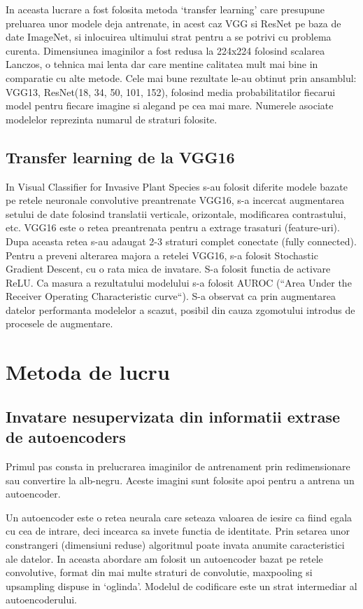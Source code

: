 \documentclass{article}
\begin{document}
In aceasta lucrare a fost folosita metoda ‘transfer learning’ care presupune preluarea unor modele deja antrenate, in acest caz VGG si ResNet pe baza de date ImageNet, si inlocuirea ultimului strat pentru a se potrivi cu problema curenta. Dimensiunea imaginilor a fost redusa la 224x224 folosind scalarea Lanczos, o tehnica mai lenta dar care mentine calitatea mult mai bine in comparatie cu alte metode. Cele mai bune rezultate le-au obtinut prin ansamblul: VGG13, ResNet(18, 34, 50, 101, 152), folosind media probabilitatilor fiecarui model pentru fiecare imagine si alegand pe cea mai mare. Numerele asociate modelelor reprezinta numarul de straturi folosite.

\subsection{Transfer learning de la VGG16}
In Visual Classifier for Invasive Plant Species\cite{ARTICLE:4} s-au folosit diferite modele bazate pe retele neuronale convolutive preantrenate VGG16, s-a incercat augmentarea setului de date folosind translatii verticale, orizontale, modificarea contrastului, etc. VGG16 este o retea preantrenata pentru a extrage trasaturi (feature-uri). Dupa aceasta retea s-au adaugat 2-3 straturi complet conectate (fully connected). Pentru a preveni alterarea majora a retelei VGG16, s-a folosit Stochastic Gradient Descent, cu o rata mica de invatare. S-a folosit functia de activare ReLU. Ca masura a rezultatului modelului s-a folosit AUROC (“Area Under the Receiver Operating Characteristic curve“). S-a observat ca prin augmentarea datelor performanta modelelor a scazut, posibil din cauza zgomotului introdus de procesele de augmentare.

\section{Metoda de lucru}

\subsection{Invatare nesupervizata din informatii extrase de autoencoders}
Primul pas consta in prelucrarea imaginilor de antrenament prin redimensionare sau convertire la alb-negru. Aceste imagini sunt folosite apoi pentru a antrena un autoencoder.

Un autoencoder este o retea neurala care seteaza valoarea de iesire ca fiind egala cu cea de intrare, deci incearca sa invete functia de identitate. Prin setarea unor constrangeri (dimensiuni reduse) algoritmul poate invata anumite caracteristici ale datelor\cite{BOOK:2}. In aceasta abordare am folosit un autoencoder bazat pe retele convolutive, format din mai multe straturi de convolutie, maxpooling si upsampling dispuse in ‘oglinda’. Modelul de codificare este un strat intermediar al autoencoderului.
\end{document}

